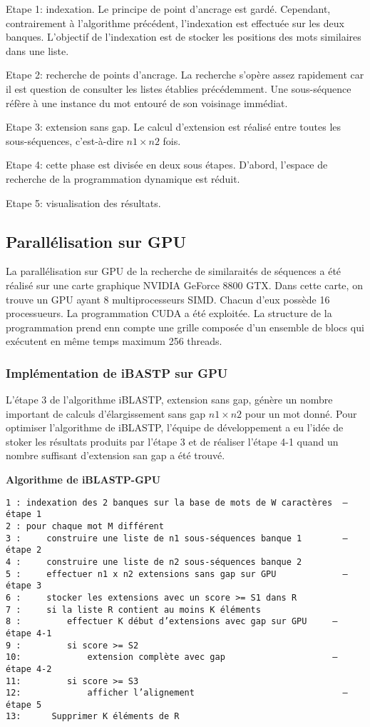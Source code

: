 Etape 1: indexation. Le principe de point d'ancrage est gardé.
Cependant, contrairement à l'algorithme précédent,
l'indexation est effectuée sur les deux banques.
L'objectif de l'indexation est de stocker les
positions des mots similaires dans une liste.

Etape 2: recherche de points d'ancrage. La recherche
s'opère assez rapidement car il est question de
consulter les listes établies précédemment.
Une sous-séquence réfère à une instance du mot
entouré de son voisinage immédiat.

Etape 3: extension sans gap. Le calcul d'extension est
réalisé entre toutes les sous-séquences,
c'est-à-dire $n1 \times n2$ fois.

Etape 4: cette phase est divisée en deux sous étapes.
D'abord, l'espace de recherche de la programmation
dynamique est réduit.

Etape 5: visualisation des résultats.

\subsection{Parallélisation sur GPU}

La parallélisation sur GPU de la recherche de similaraités
de séquences a été réalisé sur une carte graphique NVIDIA
GeForce 8800 GTX. Dans cette carte, on trouve un GPU ayant
8 multiprocesseurs SIMD. Chacun d'eux possède 16
processueurs. La programmation CUDA a été exploitée.
La structure de la programmation prend enn compte une
grille composée d'un ensemble de blocs qui exécutent
en même temps maximum 256 threads.

\subsubsection{Implémentation de iBASTP sur GPU}

L'étape 3 de l'algorithme iBLASTP, extension sans gap,
génère un nombre important de calculs d'élargissement
sans gap $n1 \times n2$ pour un mot donné. Pour optimiser
l'algorithme de iBLASTP, l'équipe de développement a
eu l'idée de stoker les résultats produits par l'étape 3
et de réaliser l'étape 4-1 quand un nombre suffisant
d'extension san gap a été trouvé.

{\bf Algorithme de iBLASTP-GPU}

\begin{verbatim}
1 : indexation des 2 banques sur la base de mots de W caractères  – étape 1
2 : pour chaque mot M différent
3 :     construire une liste de n1 sous-séquences banque 1        – étape 2
4 :     construire une liste de n2 sous-séquences banque 2
5 :     effectuer n1 x n2 extensions sans gap sur GPU             – étape 3
6 :     stocker les extensions avec un score >= S1 dans R
7 :     si la liste R contient au moins K éléments
8 :         effectuer K début d’extensions avec gap sur GPU     – étape 4-1
9 :         si score >= S2
10:             extension complète avec gap                     – étape 4-2
11:         si score >= S3
12:             afficher l’alignement                             – étape 5
13:      Supprimer K éléments de R
\end{verbatim}

